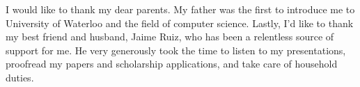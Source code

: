 I would like to thank my dear parents.  My father was the first to introduce me to University of Waterloo and the field of computer science. Lastly, I'd like to thank my best friend and husband, Jaime Ruiz, who has been a relentless source of support for me. He very generously took the time to listen to my presentations, proofread my papers and scholarship applications, and take care of household duties.

\cleardoublepage



\tableofcontents
\cleardoublepage

\listoftables
{}
\cleardoublepage

\listoffigures
{}
\cleardoublepage



